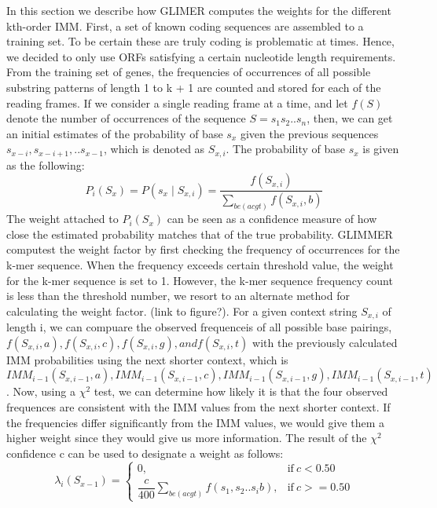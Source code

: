 \documentclass[11pt,letterpaper]{article}
\begin{document}
In this section we describe how GLIMER computes the weights for the different kth-order IMM. First, a set of known coding sequences are assembled to a training set. To be certain these are truly coding is problematic at times. Hence, we decided to only use ORFs satisfying a certain nucleotide length requirements. \\
From the training set of genes, the frequencies of occurrences of all possible substring patterns of length 1 to k + 1 are counted and stored for each of the reading frames. If we consider a single reading frame at a time, and let $f(S)$ denote the number of occurrences of the sequence $S = s_1s_2..s_n$, then, we can get an initial estimates of the probability of base $s_x$ given the previous sequences $s_{x-i}, s_{x-i+1}, .. s_{x-1}$, which is denoted as $S_{x,i}$. The probability of base $s_x$ is given as the following:
\begin{equation}
P_i(S_x) = P(s_x \mid S_{x,i})  = \dfrac{f(S_{x,i})}{\sum_{be(acgt)}f(S_{x,i}, b)}
\end{equation}
The weight attached to $P_i(S_x)$ can be seen as a confidence measure of how close the estimated probability matches that of the true probability. GLIMMER computest the weight factor by first checking the frequency of occurrences for the k-mer sequence. When the frequency exceeds certain threshold value, the weight for the k-mer sequence is set to 1. However, the k-mer sequence frequency count is less than the threshold number, we resort to an alternate method for calculating the weight factor. (link to figure?). For a given context string $S_{x,i}$ of length i, we can compuare the observed frequenceis of all possible base pairings, $f(S_{x,i},a), f(S_{x,i},c), f(S_{x,i},g), and f(S_{x,i},t)$ with the previously calculated IMM probabilities using the next shorter context, which is $IMM_{i-1}(S_{x,i-1},a), IMM_{i-1}(S_{x,i-1},c), IMM_{i-1}(S_{x,i-1},g), IMM_{i-1}(S_{x,i-1},t)$. Now, using a $\chi^2$ test, we can determine how likely it is that the four observed frequences are consistent with the IMM values from the next shorter context. If the frequencies differ significantly from the IMM values, we would give them a higher weight since they would give us more information. The result of the $\chi^2$ confidence c can be used to designate a weight as follows:
\begin{equation}
\lambda_i(S_{x-1})=
\begin{cases}
0, & \text{if}\ c < 0.50 \\
\dfrac{c}{400}\sum_{be(acgt)}f(s_1,s_2..s_ib), & \text{if}\ c>= 0.50
\end{cases}
\end{equation}
\end{document}

